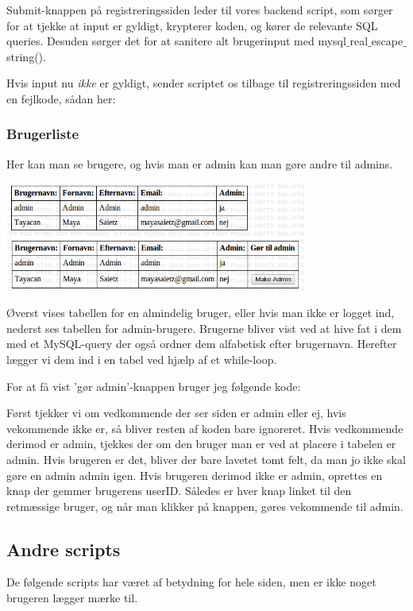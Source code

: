 \documentclass{article}
\begin{document}
Submit-knappen på registreringssiden leder til vores backend script, som sørger for at tjekke at input er gyldigt, krypterer koden, og kører de relevante SQL queries. Desuden sørger det for at sanitere alt brugerinput med mysql$\_$real$\_$escape$\_$string(). 

Hvis input nu \emph{ikke} er gyldigt, sender scriptet os tilbage til registreringssiden med en fejlkode, sådan her:



\subsubsection{Brugerliste}
Her kan man se brugere, og hvis man er admin kan man gøre andre til admins.

\begin{center}
\includegraphics[width=100mm]{mi1415.png}
\end{center}
Øverst vises tabellen for en almindelig bruger, eller hvis man ikke er logget ind, nederst ses tabellen for admin-brugere.
\newline
\newline
Brugerne bliver vist ved at hive fat i dem med et MySQL-query der også ordner dem alfabetisk efter brugernavn. Herefter lægger vi dem ind i en tabel ved hjælp af et while-loop.

For at få vist 'gør admin'-knappen bruger jeg følgende kode:



Først tjekker vi om vedkommende der ser siden er admin eller ej, hvis vekommende ikke er, så bliver resten af koden bare ignoreret. Hvis vedkommende derimod er admin, tjekkes der om den bruger man er ved at placere i tabelen er admin. Hvis brugeren er det, bliver der bare lavetet tomt felt, da man jo ikke skal gøre en admin admin igen. Hvis brugeren derimod ikke er admin, oprettes en knap der gemmer brugerens userID. Således er hver knap linket til den retmæssige bruger, og når man klikker på knappen, gøres vekommende til admin.

\subsection{Andre scripts}
De følgende scripts har været af betydning for hele siden, men er ikke noget brugeren lægger mærke til.
\end{document}
